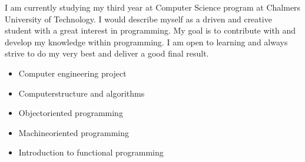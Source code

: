 I am currently studying my third year at Computer Science program at Chalmers University 
of Technology. I would describe myself as a driven and creative student with a great interest 
in programming. My goal is to contribute with and develop my knowledge within programming. 
I am open to learning and always strive to do my very best and deliver a good final result.


\begin{itemize}
    \item Computer engineering project
    \item Computerstructure and algorithms
    \item Objectoriented programming
    \item Machineoriented programming
    \item Introduction to functional programming
\end{itemize}








